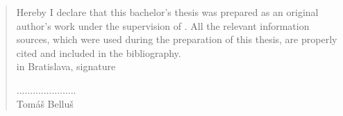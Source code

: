 \thispagestyle{empty}

\vspace*{\fill}
\begin{quote}
Hereby I declare that this bachelor's thesis was prepared as an original author's work under the supervision of \mySupervisor. All the relevant information sources, which were used during the  preparation of this thesis, are properly cited and included in the bibliography.\\

in Bratislava, \hfill signature\\
\begin{flushright}
......................\\
Tomáš Belluš
\end{flushright}
\end{quote}


\newpage{}\thispagestyle{empty}

\newpage
\thispagestyle{empty}
\mbox{}
\newpage